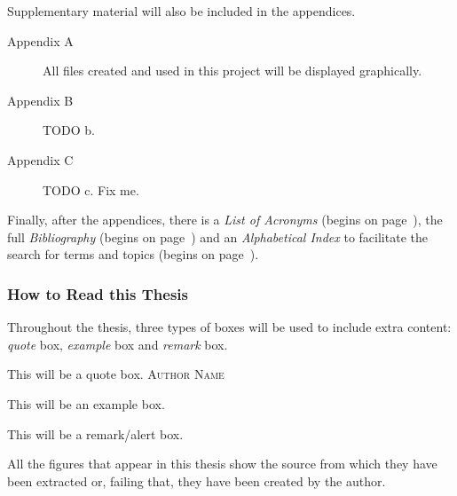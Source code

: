 Supplementary material will also be included in the appendices.

\begin{description}
  \item[Appendix A] All files created and used in this project will be
  displayed graphically. 
  \item[Appendix B] TODO b. 
  \item[Appendix C] TODO c.  Fix me.
\end{description}

Finally, after the appendices, there is a \textsl{List of Acronyms} (begins on
page~\pageref{cha:acronyms}), the full \textsl{Bibliography} (begins on
page~\pageref{cha:references}) and an \textsl{Alphabetical Index} to facilitate
the search for terms and topics (begins on page~\pageref{cha:index}).

\subsubsection{How to Read this Thesis}

Throughout the thesis, three types of boxes will be used to include extra
content: \emph{quote} box, \emph{example} box and \emph{remark} box.

\begin{quoteBox}
  This will be a quote box.
  \tcblower\textsc{Author Name}
\end{quoteBox}

\begin{exampleBox}
  This will be an example box.
\end{exampleBox}

\begin{remarkBox}
  This will be a remark/alert box.
\end{remarkBox}

All the figures that appear in this thesis show the source from which they have
been extracted or, failing that, they have been created by the author.
